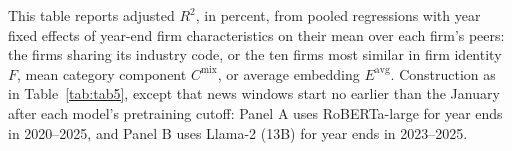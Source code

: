 \begin{table}[htbp]
\centering
\caption{Firm Networks after the Pretraining Cutoffs}
\label{tab:tabC_post_networks}
\begin{minipage}{\linewidth}\footnotesize
This table reports adjusted $R^2$, in percent, from pooled regressions with year fixed effects of year-end firm characteristics on their mean over each firm's peers: the firms sharing its industry code, or the ten firms most similar in firm identity $F$, mean category component $C^{\mathrm{mix}}$, or average embedding $E^{\mathrm{avg}}$. Construction as in Table~\ref{tab:tab5}, except that news windows start no earlier than the January after each model's pretraining cutoff: Panel A uses RoBERTa-large for year ends in 2020--2025, and Panel B uses Llama-2 (13B) for year ends in 2023--2025.
\end{minipage}
\medskip


\end{table}

